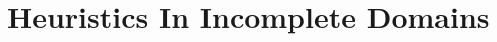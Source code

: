 \documentclass{article}
\def\citep#1{\cite{#1}} \def\citet#1{\citeA{#1}}
\def\und#1{\noindent{\bf #1}:}
\def\und#1{\medskip{\noindent\bf #1:}}
\begin{document}
%
%




\section{Heuristics In Incomplete Domains}
\end{document}
